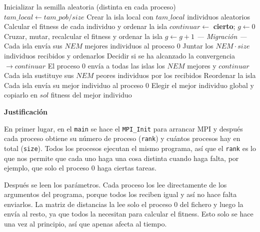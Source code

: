 \documentclass[12pt]{article}
\begin{document}
\begin{enumerate}
\begin{algorithm}[H]
\caption{Algoritmo evolutivo con modelo de islas (\texttt{aplicar\_mh})}
\begin{algorithmic}[1]
    \State Inicializar la semilla aleatoria (distinta en cada proceso)
    \State $tam\_local \gets tam\_pob / size$ 
    \State Crear la isla local con $tam\_local$ individuos aleatorios
    \State Calcular el fitness de cada individuo y ordenar la isla
    \State $continuar \gets$ \textbf{cierto}; \quad $g \gets 0$
         
            \State Cruzar, mutar, recalcular el fitness y ordenar la isla
            \State $g \gets g + 1$
        \EndFor
        \State \textit{--- Migración ---}
        \State Cada isla envía sus $NEM$ mejores individuos al proceso 0
            \State Juntar los $NEM \cdot size$ individuos recibidos y ordenarlos
            \State Decidir si se ha alcanzado la convergencia $\rightarrow continuar$
        \EndIf
        \State El proceso 0 envía a todas las islas los $NEM$ mejores y $continuar$
        \State Cada isla sustituye sus $NEM$ peores individuos por los recibidos
        \State Reordenar la isla
    \EndWhile
    \State Cada isla envía su mejor individuo al proceso 0
        \State Elegir el mejor individuo global y copiarlo en $sol$
    \EndIf
    \State \Return fitness del mejor individuo
\EndFunction
\end{algorithmic}
\end{algorithm}
 
\medskip
\noindent\textbf{Justificación}\par
\smallskip
 
En primer lugar, en el \texttt{main} se hace el \texttt{MPI\_Init} para arrancar MPI y después cada proceso obtiene su número de proceso (\texttt{rank}) y cuántos procesos hay en total (\texttt{size}). Todos los procesos ejecutan el mismo programa, así que el \texttt{rank} es lo que nos permite que cada uno haga una cosa distinta cuando haga falta, por ejemplo, que solo el proceso 0 haga ciertas tareas.
 
Después se leen los parámetros. Cada proceso los lee directamente de los argumentos del programa, porque todos los reciben igual y así no hace falta enviarlos. La matriz de distancias la lee solo el proceso 0 del fichero y luego la envía al resto, ya que todos la necesitan para calcular el fitness. Esto solo se hace una vez al principio, así que apenas afecta al tiempo.
 

\end{enumerate}
\end{document}
